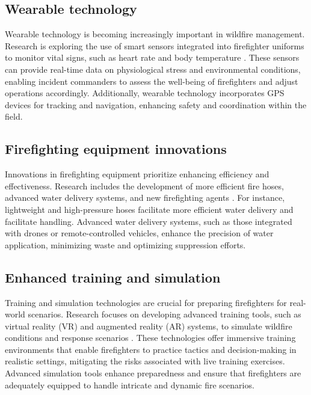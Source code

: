 \documentclass[
  12 pt,
]{Nemilov}
\begin{document}
\subsection{Wearable technology}\label{wearable-technology}

Wearable technology is becoming increasingly important in wildfire management. Research is exploring the use of smart sensors integrated into firefighter uniforms to monitor vital signs, such as heart rate and body temperature \citep{parker2017measuring, shakeriaski2022challenges}. These sensors can provide real-time data on physiological stress and environmental conditions, enabling incident commanders to assess the well-being of firefighters and adjust operations accordingly. Additionally, wearable technology incorporates GPS devices for tracking and navigation, enhancing safety and coordination within the field.

\subsection{Firefighting equipment innovations}\label{firefighting-equipment-innovations}

Innovations in firefighting equipment prioritize enhancing efficiency and effectiveness. Research includes the development of more efficient fire hoses, advanced water delivery systems, and new firefighting agents \citep{ando2019fire, han2017development}. For instance, lightweight and high-pressure hoses facilitate more efficient water delivery and facilitate handling. Advanced water delivery systems, such as those integrated with drones or remote-controlled vehicles, enhance the precision of water application, minimizing waste and optimizing suppression efforts.

\subsection{Enhanced training and simulation}\label{enhanced-training-and-simulation}

Training and simulation technologies are crucial for preparing firefighters for real-world scenarios. Research focuses on developing advanced training tools, such as virtual reality (VR) and augmented reality (AR) systems, to simulate wildfire conditions and response scenarios \citep{narciso2020virtual, reis2019application}. These technologies offer immersive training environments that enable firefighters to practice tactics and decision-making in realistic settings, mitigating the risks associated with live training exercises. Advanced simulation tools enhance preparedness and ensure that firefighters are adequately equipped to handle intricate and dynamic fire scenarios.
\end{document}
